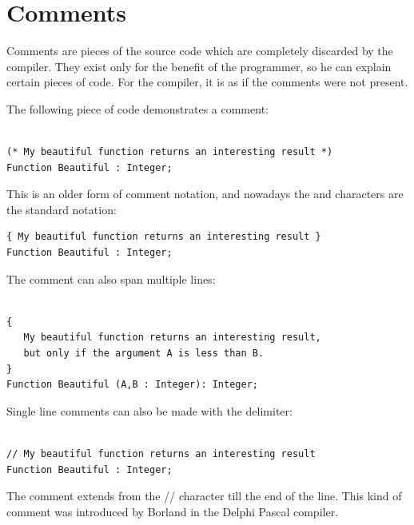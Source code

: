 \section{Comments}
Comments are pieces of the source code which are completely discarded by the
compiler. They exist only for the benefit of the programmer, so he can
explain certain pieces of code. For the compiler, it is as if the comments
were not present.

The following piece of code demonstrates a comment:
\begin{verbatim}

(* My beautiful function returns an interesting result *)
Function Beautiful : Integer;

\end{verbatim}
This is an older form of comment notation, and nowadays the  \var{\{} and \var{\}}
characters are the standard notation:
\begin{verbatim}
{ My beautiful function returns an interesting result }
Function Beautiful : Integer;

\end{verbatim}
The comment can also span multiple lines:
\begin{verbatim}

{
   My beautiful function returns an interesting result,
   but only if the argument A is less than B.
}
Function Beautiful (A,B : Integer): Integer;
\end{verbatim}
Single line comments can also be made with the \var{//} delimiter:
\begin{verbatim}

// My beautiful function returns an interesting result
Function Beautiful : Integer;

\end{verbatim}
The comment extends from the // character till the end of the line.
This kind of comment was introduced by Borland in the Delphi Pascal
compiler.

